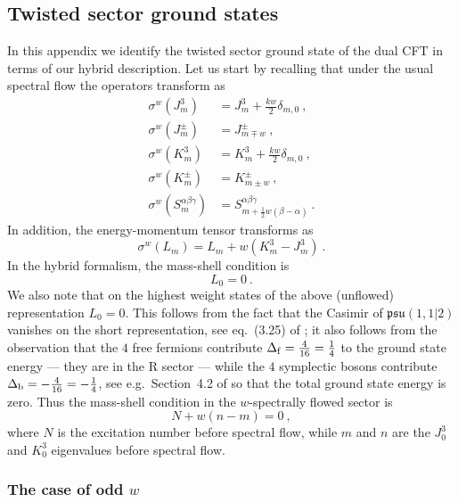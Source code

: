 \documentclass[a4paper,11pt]{article}
\numberwithin{equation}{section}
\def\be{\begin{equation}}
\def\ee{\end{equation}}
\begin{document}
\subsection{Twisted sector ground states}\label{app:twisted}

In this appendix we identify the twisted sector ground state of the dual CFT in terms of our hybrid description. Let us start by recalling that under the usual spectral flow the operators transform as 
\begin{subequations}
\begin{align}
\sigma^w (J^3_m)&=J^3_m+\tfrac{kw}{2}\delta_{m,0}\ , \label{eq:spectral flow a}\\
\sigma^w(J^\pm_m)&=J^\pm_{m\mp w}\ , \label{eq:spectral flow b}\\
\sigma^w(K^3_m)&=K^3_m+\tfrac{k w}{2}\delta_{m,0}\ , \label{eq:spectral flow c}\\
\sigma^w(K^\pm_m)&=K^\pm_{m \pm w}\ , \label{eq:spectral flow d}\\
\sigma^w(S^{\alpha\beta\gamma}_m)&=S^{\alpha\beta\gamma}_{m+\frac{1}{2}w(\beta-\alpha)}\ .\label{eq:spectral flow e}
\end{align}
\end{subequations}
In addition, the energy-momentum tensor transforms as 
\be 
\sigma^w(L_m)= L_m+w(K_m^3-J_m^3)\ . \label{eq:spectral flow f} 
\ee
 In the hybrid formalism, the mass-shell condition is 
\be
L_0=0 \ .
\ee
We also note that on the highest weight states of the above (unflowed) representation $L_0=0$. This follows from the fact that the Casimir of $\mathfrak{psu}(1,1|2)$ vanishes on the short representation, see eq.~(3.25) of  \cite{Eberhardt:2018ouy}; it also follows from the observation that the $4$ free fermions contribute $\Delta_{\rm f} = \frac{4}{16}=\frac{1}{4}$ to the ground state energy --- they are in the R sector --- while the $4$ symplectic bosons contribute $\Delta_{\rm b} = - \frac{4}{16}= - \frac{1}{4}$, see e.g.\ Section~4.2 of \cite{Gaberdiel:2018rqv} so that the total ground state energy is zero. Thus the mass-shell condition in the $w$-spectrally flowed sector is 
\be\label{massshell}
N + w (n-m) = 0 \ , 
\ee
where $N$ is the excitation number before spectral flow, while $m$ and $n$ are the $J^3_0$ and $K^3_0$ eigenvalues before spectral flow. 

\subsubsection[The case of odd \texorpdfstring{$w$}{w}]{\boldmath The case of odd \texorpdfstring{$w$}{w}} 
\end{document}
